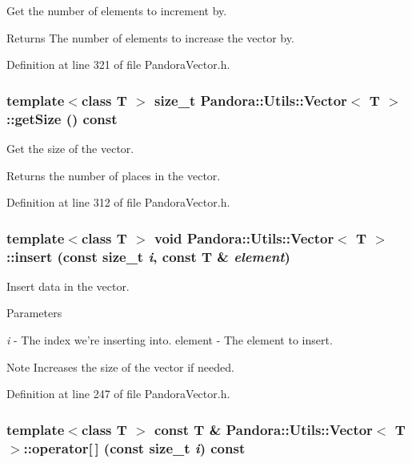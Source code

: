 Get the number of elements to increment by. \begin{DoxyReturn}{Returns}
The number of elements to increase the vector by. 
\end{DoxyReturn}


Definition at line 321 of file PandoraVector.h.\hypertarget{classPandora_1_1Utils_1_1Vector_a8df1cb3c4cc21dca4b093eed28c62b9a}{
\subsubsection[{getSize}]{\setlength{\rightskip}{0pt plus 5cm}template$<$class T $>$ size\_\-t {\bf Pandora::Utils::Vector}$<$ T $>$::getSize () const}}
\label{classPandora_1_1Utils_1_1Vector_a8df1cb3c4cc21dca4b093eed28c62b9a}


Get the size of the vector. \begin{DoxyReturn}{Returns}
the number of places in the vector. 
\end{DoxyReturn}


Definition at line 312 of file PandoraVector.h.\hypertarget{classPandora_1_1Utils_1_1Vector_a8757e06ea29132d0b8873a13b6c1d956}{
\subsubsection[{insert}]{\setlength{\rightskip}{0pt plus 5cm}template$<$class T $>$ void {\bf Pandora::Utils::Vector}$<$ T $>$::insert (const size\_\-t {\em i}, \/  const T \& {\em element})}}
\label{classPandora_1_1Utils_1_1Vector_a8757e06ea29132d0b8873a13b6c1d956}


Insert data in the vector. 
\begin{DoxyParams}{Parameters}
\item[{\em i}]-\/ The index we're inserting into. element -\/ The element to insert. \end{DoxyParams}
\begin{DoxyNote}{Note}
Increases the size of the vector if needed. 
\end{DoxyNote}


Definition at line 247 of file PandoraVector.h.\hypertarget{classPandora_1_1Utils_1_1Vector_a9841fe5df9567810a8be69891e5bf5cf}{
\subsubsection[{operator[]}]{\setlength{\rightskip}{0pt plus 5cm}template$<$class T $>$ const T \& {\bf Pandora::Utils::Vector}$<$ T $>$::operator\mbox{[}$\,$\mbox{]} (const size\_\-t {\em i}) const}}
\label{classPandora_1_1Utils_1_1Vector_a9841fe5df9567810a8be69891e5bf5cf}


